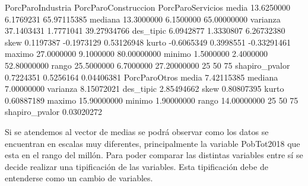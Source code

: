 \documentclass[11pt]{article}
\begin{document}
\begin{Schunk}
\begin{Soutput}
               PorcParoIndustria PorcParoConstruccion PorcParoServicios
media                 13.6250000            6.1769231       65.97115385
mediana               13.3000000            6.1500000       65.00000000
varianza              37.1403431            1.7771041       39.27934766
des_tipic              6.0942877            1.3330807        6.26732380
skew                   0.1197387           -0.1973129        0.53126948
kurto                 -0.6065349            0.3998551       -0.33291461
maximo                27.0000000            9.1000000       80.00000000
minimo                 1.5000000            2.4000000       52.80000000
rango                 25.5000000            6.7000000       27.20000000
25%                    8.7000000            5.5500000       60.95000000
50%                   13.3000000            6.1500000       65.00000000
75%                   17.6500000            6.8250000       70.12500000
shapiro_pvalor         0.7224351            0.5256164        0.04406381
               PorcParoOtros
media             7.42115385
mediana           7.00000000
varianza          8.15072021
des_tipic         2.85494662
skew              0.80807395
kurto             0.60887189
maximo           15.90000000
minimo            1.90000000
rango            14.00000000
25%               5.47500000
50%               7.00000000
75%               9.10000000
shapiro_pvalor    0.03020272
\end{Soutput}
\end{Schunk}

Si se atendemos al vector de medias se podrá observar como los datos se encuentran en escalas muy diferentes, principalmente la variable PobTot2018 que esta en el rango del millón. Para poder comparar las distintas variables entre sí se decide realizar una tipificación de las variables. Esta tipificación debe de entenderse como un cambio de variables. 
\end{document}
